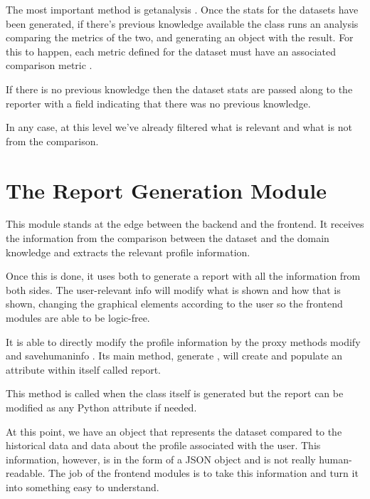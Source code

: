 The most important method is  getanalysis . Once the stats for the datasets have been generated, if there's previous knowledge available the class runs an analysis comparing the metrics of the two, and generating an object with the result. For this to happen, each metric defined for the dataset must have an associated  comparison metric .

If there is no previous knowledge then the dataset stats are passed along to the reporter with a field indicating that there was no previous knowledge.

In any case, at this level we've already filtered what is relevant and what is not from the comparison.

\section{The Report Generation Module}
\label{cap2:sec:reporter}

This module stands at the edge between the backend and the frontend. It receives the information from the comparison between the dataset and the domain knowledge and extracts the relevant profile information.

Once this is done, it uses both to generate a report with all the information from both sides. The user-relevant info will modify what is shown and  how  that is shown, changing the graphical elements according to the user so the frontend modules are able to be logic-free.

It is able to directly modify the profile information by the proxy methods  modify  and  savehumaninfo . Its main method,  generate , will create and populate an attribute within itself called report.

This method is called when the class itself is generated but the report can be modified as any Python attribute if needed.

At this point, we have an object that represents the dataset compared to the historical data and data about the profile associated with the user. This information, however, is in the form of a JSON object and is not really human-readable. The job of the frontend modules is to take this information and turn it into something easy to understand.

